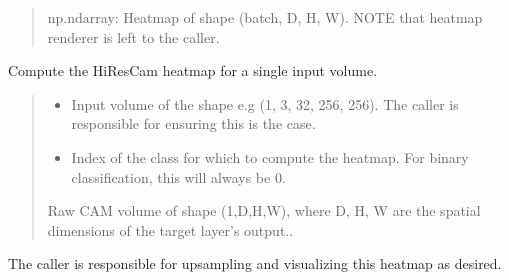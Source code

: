 \documentclass[letterpaper,10pt,english]{sphinxmanual}
\begin{document}
\begin{fulllineitems}
\begin{fulllineitems}
\begin{quote}
\begin{description}
\begin{itemize}
\end{itemize}

\sphinxAtStartPar
np.ndarray: Heatmap of shape (batch, D, H, W). NOTE that heatmap renderer is left to the caller.

\end{description}\end{quote}

\end{fulllineitems}


\begin{fulllineitems}
\label{\detokenize{hirescam:hirescam.HiResCam.return_explanation}}
\pysigstartsignatures
\pysiglinewithargsret
{}
{\sphinxparamcomma {}}
{}
\pysigstopsignatures
\sphinxAtStartPar
Compute the HiResCam heatmap for a single input volume.
\begin{quote}\begin{description}
\begin{itemize}
\item {} 
\sphinxAtStartPar
{} \textendash{} Input volume of the shape e.g (1, 3, 32, 256, 256). The caller is responsible for ensuring this is the case.

\item {} 
\sphinxAtStartPar
{} \textendash{} Index of the class for which to compute the heatmap. For binary classification, this will always be 0.

\end{itemize}

\sphinxAtStartPar
Raw CAM volume of shape (1,D,H,W), where D, H, W are the spatial dimensions of the target layer’s output..

\end{description}\end{quote}

\sphinxAtStartPar
The caller is responsible for upsampling and visualizing this heatmap as desired.

\end{fulllineitems}


\end{fulllineitems}
\end{document}
